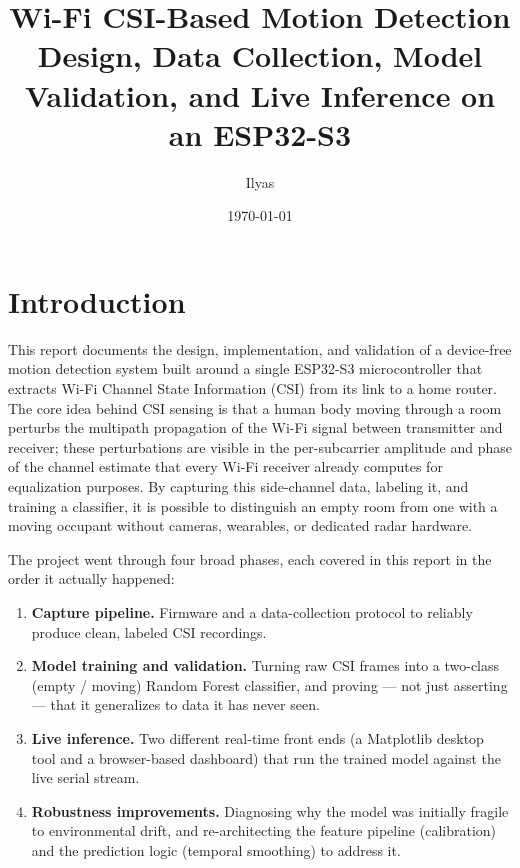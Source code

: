\documentclass[11pt,a4paper]{article}
\title{\textbf{Wi-Fi CSI-Based Motion Detection}\\
\large Design, Data Collection, Model Validation, and Live Inference on an ESP32-S3}
\author{Ilyas}
\date{\today}
\begin{document}
\maketitle
\tableofcontents
\newpage

\section{Introduction}

This report documents the design, implementation, and validation of a
device-free motion detection system built around a single ESP32-S3
microcontroller that extracts Wi-Fi Channel State Information (CSI) from
its link to a home router. The core idea behind CSI sensing is that a
human body moving through a room perturbs the multipath propagation of
the Wi-Fi signal between transmitter and receiver; these perturbations
are visible in the per-subcarrier amplitude and phase of the channel
estimate that every Wi-Fi receiver already computes for equalization
purposes. By capturing this side-channel data, labeling it, and training
a classifier, it is possible to distinguish an empty room from one with
a moving occupant without cameras, wearables, or dedicated radar
hardware.

The project went through four broad phases, each covered in this report
in the order it actually happened:

\begin{enumerate}[label=\textbf{Phase \arabic*.}, leftmargin=2.2cm]
    \item \textbf{Capture pipeline.} Firmware and a data-collection
    protocol to reliably produce clean, labeled CSI recordings.
    \item \textbf{Model training and validation.} Turning raw CSI frames
    into a two-class (empty / moving) Random Forest classifier, and
    proving --- not just asserting --- that it generalizes to data it has
    never seen.
    \item \textbf{Live inference.} Two different real-time front ends
    (a Matplotlib desktop tool and a browser-based dashboard) that run
    the trained model against the live serial stream.
    \item \textbf{Robustness improvements.} Diagnosing why the model was
    initially fragile to environmental drift, and re-architecting the
    feature pipeline (calibration) and the prediction logic (temporal
    smoothing) to address it.
\end{enumerate}
\end{document}
